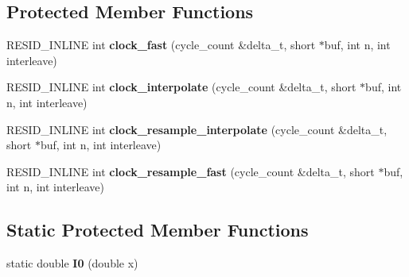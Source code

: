 \subsection*{Protected Member Functions}
\begin{DoxyCompactItemize}
\item 
\hypertarget{classSID2_a5a0eaedd9f2e9341d47389ae13237859}{R\-E\-S\-I\-D\-\_\-\-I\-N\-L\-I\-N\-E int {\bfseries clock\-\_\-fast} (cycle\-\_\-count \&delta\-\_\-t, short $\ast$buf, int n, int interleave)}\label{classSID2_a5a0eaedd9f2e9341d47389ae13237859}

\item 
\hypertarget{classSID2_a58345353f8177ef53e3a2effa91ca23d}{R\-E\-S\-I\-D\-\_\-\-I\-N\-L\-I\-N\-E int {\bfseries clock\-\_\-interpolate} (cycle\-\_\-count \&delta\-\_\-t, short $\ast$buf, int n, int interleave)}\label{classSID2_a58345353f8177ef53e3a2effa91ca23d}

\item 
\hypertarget{classSID2_a3b9bdc49ca63800ac2a90bf9b04f40c1}{R\-E\-S\-I\-D\-\_\-\-I\-N\-L\-I\-N\-E int {\bfseries clock\-\_\-resample\-\_\-interpolate} (cycle\-\_\-count \&delta\-\_\-t, short $\ast$buf, int n, int interleave)}\label{classSID2_a3b9bdc49ca63800ac2a90bf9b04f40c1}

\item 
\hypertarget{classSID2_a75b0395b7534dc9deb842f22656a4d54}{R\-E\-S\-I\-D\-\_\-\-I\-N\-L\-I\-N\-E int {\bfseries clock\-\_\-resample\-\_\-fast} (cycle\-\_\-count \&delta\-\_\-t, short $\ast$buf, int n, int interleave)}\label{classSID2_a75b0395b7534dc9deb842f22656a4d54}

\end{DoxyCompactItemize}
\subsection*{Static Protected Member Functions}
\begin{DoxyCompactItemize}
\item 
\hypertarget{classSID2_abf51da160e43f5a8169be4f2284ae5d6}{static double {\bfseries I0} (double x)}\label{classSID2_abf51da160e43f5a8169be4f2284ae5d6}

\end{DoxyCompactItemize}
